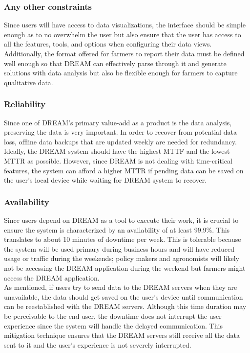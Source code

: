 \subsubsection{Any other constraints}
\begin{flushleft}
Since users will have access to data visualizations, the interface should be simple enough as to no overwhelm the user but also ensure that the user has access to all the features, tools, and options when configuring their data views. Additionally, the format offered for farmers to report their data must be defined well enough so that DREAM can effectively parse through it and generate solutions with data analysis but also be flexible enough for farmers to capture qualitative data.
\end{flushleft}

\subsubsection{Reliability}
\begin{flushleft}
Since one of DREAM's primary value-add as a product is the data analysis, preserving the data is very important. In order to recover from potential data loss, offline data backups that are updated weekly are needed for redundancy. Ideally, the DREAM system should have the highest MTTF and the lowest MTTR as possible. However, since DREAM is not dealing with time-critical features, the system can afford a higher MTTR if pending data can be saved on the user's local device while waiting for DREAM system to recover.
\end{flushleft}

\subsubsection{Availability}
\begin{flushleft}

Since users depend on DREAM as a tool to execute their work, it is crucial to ensure the system is characterized by an availability of at least 99.9\%. This translates to about 10 minutes of downtime per week. This is tolerable because the system will be used primary during business hours and will have reduced usage or traffic during the weekends; policy makers and agronomists will likely not be accessing the DREAM application during the weekend but farmers might access the DREAM application.\smallskip\\
As mentioned, if users try to send data to the DREAM servers when they are unavailable, the data should get saved on the user's device until communication can be reestablished with the DREAM servers. Although this time duration may be perceivable to the end-user, the downtime does not interrupt the user experience since the system will handle the delayed communication. This mitigation technique ensures that the DREAM servers still receive all the data sent to it and the user's experience is not severely interrupted.\\ 
\end{flushleft}

